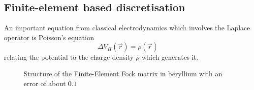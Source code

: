 \subsection{Finite-element based discretisation}
\label{sec:FE}

An important equation from classical electrodynamics which
involves the Laplace operator is Poisson's equation
\begin{equation}
	\Delta V_H(\vec{r}) = \rho(\vec{r})
	\label{eqn:Poisson}
\end{equation}
relating the potential to the charge density $\rho$ which generates it.





\begin{figure}
	\centering
	\caption{Structure of the Finite-Element Fock matrix in beryllium
		with an error of about $0.1$}
	\label{fig:StructureFiniteElementFock}
\end{figure}

